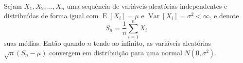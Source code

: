 \documentclass{article}
\begin{document}
Sejam $X_1, X_2, \ldots, X_n$ uma sequência de variáveis aleatórias independentes e distribuídas de forma igual com $\operatorname{E}[X_i] = \mu$ e $\operatorname{Var}[X_i] = \sigma^2 < \infty$, e denote
\begin{equation*}
  S_n = \frac{1}{n}\sum_{i=1}^{n} X_i
\end{equation*}
suas médias.
Então quando $n$ tende ao infinito, as variáveis aleatórias $\sqrt{n}(S_n - \mu)$ convergem em distribuição para uma normal $N(0, \sigma^2)$.

\end{document}
